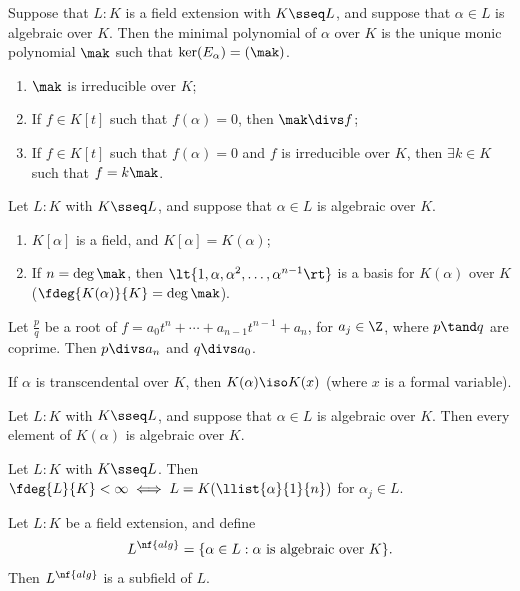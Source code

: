 \documentclass[a4paper]{article}
\begin{document}
\begin{tdefinition}
  Suppose that \( L : K \) is a field extension with \( K \sseq L \), and suppose that \( \alpha\in L \) is algebraic over \( K \).
  Then the minimal polynomial of \( \alpha \) over \( K \) is the unique monic polynomial \( \mak \) such that \( \ker(E_\alpha) = (\mak) \).
\end{tdefinition}

\begin{tlemma}
  \begin{enumerate}
    \item \( \mak \) is irreducible over \( K \);
    \item If \( f\in K[t] \) such that \( f(\alpha) = 0 \), then \( \mak\divs f \);
    \item If \( f\in K[t] \) such that \( f(\alpha) = 0 \) and \( f \) is irreducible over \( K \), then \( \exists k\in K \) such that \( f=k\mak \).
  \end{enumerate}
\end{tlemma}

\begin{ttheorem}
  Let \( L : K \) with \( K \sseq L \), and suppose that \( \alpha\in L \) is algebraic over \( K \).
  \begin{enumerate}[label=(\roman*)]
    \item \( K[\alpha] \) is a field, and \( K[\alpha] = K(\alpha) \);
    \item If \( n=\deg \mak \), then \( \lt\{ 1,\alpha,\alpha^2,\ldots,\alpha^{n-1} \rt\} \) is a basis for \( K(\alpha) \) over \( K \) (\imp \( \fdeg{K(\alpha)}{K}=\deg \mak \)).
  \end{enumerate}
\end{ttheorem}

\begin{ttheorem}
  Let \( \frac{p}{q} \) be a root of \( f= a_0t^n+\cdots + a_{n-1} t^{n-1} + a_n \), for \( a_j\in\Z \), where \( p\tand q \) are coprime.
  Then \( p\divs a_n \) and \( q\divs a_0 \).
\end{ttheorem}

\quad If \( \alpha \) is transcendental over \( K \), then \( K(\alpha)\iso K(x) \) (where \( x \) is a formal variable).

\begin{tcorollary}
  Let \( L : K \) with \( K \sseq L \), and suppose that \( \alpha\in L \) is algebraic over \( K \).
  Then every element of \( K(\alpha) \) is algebraic over \( K \).
\end{tcorollary}

\begin{tcorollary}
  Let \( L:K \) with \( K\sseq L \).
  Then \( \fdeg{L}{K} < \infty \iff L=K(\llist{\alpha}{1}{n}) \) for \( \alpha_j\in L \).
\end{tcorollary}

\begin{ttheorem}
  Let \( L:K \) be a field extension, and define \begin{align*}
    L^{\nf{alg}}=\{\alpha\in L : \alpha \text{ is algebraic over } K\}.
  \end{align*}
  Then \( L^{\nf{alg}} \) is a subfield of \( L \).
\end{ttheorem}
\end{document}
